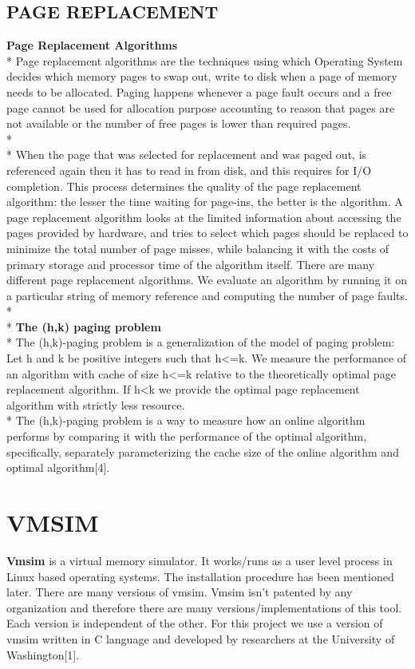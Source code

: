 \documentclass[12pt, oneside, a4paper]{report}
\begin{document}
\subsection*{PAGE REPLACEMENT}
\textbf{Page Replacement Algorithms}
\\*
Page replacement algorithms are the techniques using which Operating System decides which memory pages to swap out, write to disk when a page of memory needs to be allocated. Paging happens whenever a page fault occurs and a free page cannot be used for allocation purpose accounting to reason that pages are not available or the number of free pages is lower than required pages.
\\*
\\*
When the page that was selected for replacement and was paged out, is referenced again then it has to read in from disk, and this requires for I/O completion. This process determines the quality of the page replacement algorithm: the lesser the time waiting for page-ins, the better is the algorithm. A page replacement algorithm looks at the limited information about accessing the pages provided by hardware, and tries to select which pages should be replaced to minimize the total number of page misses, while balancing it with the costs of primary storage and processor time of the algorithm itself. There are many different page replacement algorithms. We evaluate an algorithm by running it on a particular string of memory reference and computing the number of page faults.
\\*
\\*
\textbf{The (h,k) paging problem}
\\*
The (h,k)-paging problem is a generalization of the model of paging problem: Let h and k be positive integers such that h<=k. We measure the performance of an algorithm with cache of size h<=k relative to the theoretically optimal page replacement algorithm. If h<k we provide the optimal page replacement algorithm with strictly less resource.
\\*
The (h,k)-paging problem is a way to measure how an online algorithm performs by comparing it with the performance of the optimal algorithm, specifically, separately parameterizing the cache size of the online algorithm and optimal algorithm[4].
\newpage

\section*{VMSIM}
\textbf{Vmsim} is a virtual memory simulator. It works/runs as a user level process in Linux based operating systems. The installation procedure has been mentioned later. There are many versions of vmsim. Vmsim isn't patented by any organization and therefore there are many versions/implementations of this tool. Each version is independent of the other. For this project we use a version of vmsim written in C language and developed by researchers at the University of Washington[1].
\end{document}
